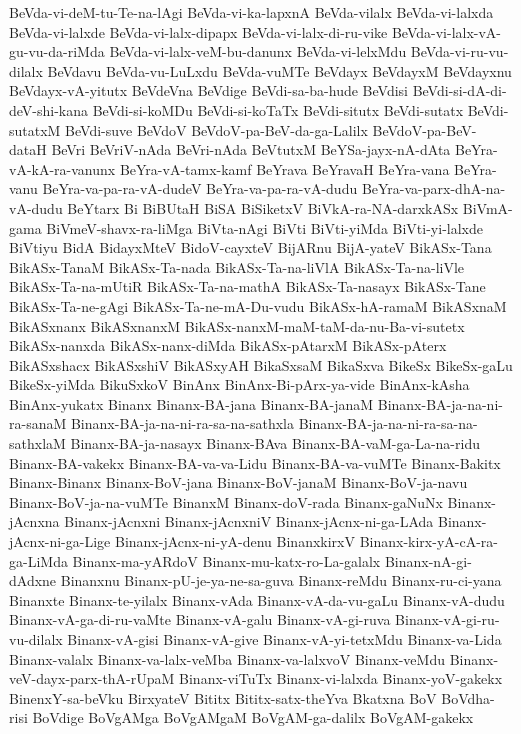 {BeVda-vi-deM-tu-Te-na-lAgi
BeVda-vi-ka-lapxnA
BeVda-vilalx
BeVda-vi-lalxda
BeVda-vi-lalxde
BeVda-vi-lalx-dipapx
BeVda-vi-lalx-di-ru-vike
BeVda-vi-lalx-vA-gu-vu-da-riMda
BeVda-vi-lalx-veM-bu-danunx
BeVda-vi-lelxMdu
BeVda-vi-ru-vu-dilalx
BeVdavu
BeVda-vu-LuLxdu
BeVda-vuMTe
BeVdayx
BeVdayxM
BeVdayxnu
BeVdayx-vA-yitutx
BeVdeVna
BeVdige
BeVdi-sa-ba-hude
BeVdisi
BeVdi-si-dA-di-deV-shi-kana
BeVdi-si-koMDu
BeVdi-si-koTaTx
BeVdi-situtx
BeVdi-sutatx
BeVdi-sutatxM
BeVdi-suve
BeVdoV
BeVdoV-pa-BeV-da-ga-Lalilx
BeVdoV-pa-BeV-dataH
BeVri
BeVriV-nAda
BeVri-nAda
BeVtutxM
BeYSa-jayx-nA-dAta
BeYra-vA-kA-ra-vanunx
BeYra-vA-tamx-kamf
BeYrava
BeYravaH
BeYra-vana
BeYra-vanu
BeYra-va-pa-ra-vA-dudeV
BeYra-va-pa-ra-vA-dudu
BeYra-va-parx-dhA-na-vA-dudu
BeYtarx
Bi
BiBUtaH
BiSA
BiSiketxV
BiVkA-ra-NA-darxkASx
BiVmA-gama
BiVmeV-shavx-ra-liMga
BiVta-nAgi
BiVti
BiVti-yiMda
BiVti-yi-lalxde
BiVtiyu
BidA
BidayxMteV
BidoV-cayxteV
BijARnu
BijA-yateV
BikASx-Tana
BikASx-TanaM
BikASx-Ta-nada
BikASx-Ta-na-liVlA
BikASx-Ta-na-liVle
BikASx-Ta-na-mUtiR
BikASx-Ta-na-mathA
BikASx-Ta-nasayx
BikASx-Tane
BikASx-Ta-ne-gAgi
BikASx-Ta-ne-mA-Du-vudu
BikASx-hA-ramaM
BikASxnaM
BikASxnanx
BikASxnanxM
BikASx-nanxM-maM-taM-da-nu-Ba-vi-sutetx
BikASx-nanxda
BikASx-nanx-diMda
BikASx-pAtarxM
BikASx-pAterx
BikASxshacx
BikASxshiV
BikASxyAH
BikaSxsaM
BikaSxva
BikeSx
BikeSx-gaLu
BikeSx-yiMda
BikuSxkoV
BinAnx
BinAnx-Bi-pArx-ya-vide
BinAnx-kAsha
BinAnx-yukatx
Binanx
Binanx-BA-jana
Binanx-BA-janaM
Binanx-BA-ja-na-ni-ra-sanaM
Binanx-BA-ja-na-ni-ra-sa-na-sathxla
Binanx-BA-ja-na-ni-ra-sa-na-sathxlaM
Binanx-BA-ja-nasayx
Binanx-BAva
Binanx-BA-vaM-ga-La-na-ridu
Binanx-BA-vakekx
Binanx-BA-va-va-Lidu
Binanx-BA-va-vuMTe
Binanx-Bakitx
Binanx-Binanx
Binanx-BoV-jana
Binanx-BoV-janaM
Binanx-BoV-ja-navu
Binanx-BoV-ja-na-vuMTe
BinanxM
Binanx-doV-rada
Binanx-gaNuNx
Binanx-jAcnxna
Binanx-jAcnxni
Binanx-jAcnxniV
Binanx-jAcnx-ni-ga-LAda
Binanx-jAcnx-ni-ga-Lige
Binanx-jAcnx-ni-yA-denu
BinanxkirxV
Binanx-kirx-yA-cA-ra-ga-LiMda
Binanx-ma-yARdoV
Binanx-mu-katx-ro-La-galalx
Binanx-nA-gi-dAdxne
Binanxnu
Binanx-pU-je-ya-ne-sa-guva
Binanx-reMdu
Binanx-ru-ci-yana
Binanxte
Binanx-te-yilalx
Binanx-vAda
Binanx-vA-da-vu-gaLu
Binanx-vA-dudu
Binanx-vA-ga-di-ru-vaMte
Binanx-vA-galu
Binanx-vA-gi-ruva
Binanx-vA-gi-ru-vu-dilalx
Binanx-vA-gisi
Binanx-vA-give
Binanx-vA-yi-tetxMdu
Binanx-va-Lida
Binanx-valalx
Binanx-va-lalx-veMba
Binanx-va-lalxvoV
Binanx-veMdu
Binanx-veV-dayx-parx-thA-rUpaM
Binanx-viTuTx
Binanx-vi-lalxda
Binanx-yoV-gakekx
BinenxY-sa-beVku
BirxyateV
Bititx
Bititx-satx-theYva
Bkatxna
BoV
BoVdha-risi
BoVdige
BoVgAMga
BoVgAMgaM
BoVgAM-ga-dalilx
BoVgAM-gakekx
}
